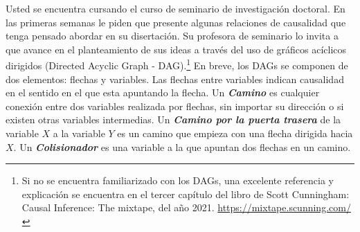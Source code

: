 \documentclass[a4paper]{article}
\begin{document}
Usted se encuentra cursando el curso de seminario de investigación doctoral. En las primeras semanas le piden que presente algunas relaciones de causalidad que tenga pensado abordar en su disertación. Su profesora de seminario lo invita a que avance en el planteamiento de sus ideas a través del uso de gráficos acíclicos dirigidos (Directed Acyclic Graph - DAG).\footnote{Si no se encuentra familiarizado con los DAGs, una excelente referencia y explicación se encuentra en el tercer capítulo del libro  de Scott Cunningham: Causal Inference: The mixtape, del año 2021. \url{https://mixtape.scunning.com/}   }  En breve, los DAGs se componen de dos elementos: flechas y variables. Las flechas entre variables indican causalidad en el sentido en el que esta apuntando la flecha. Un \textbf{\textit{Camino}} es cualquier conexión entre dos variables realizada por flechas, sin importar su dirección o si existen otras variables intermedias. Un \textbf{\textit{Camino por la puerta trasera}} de la variable $X$ a la variable $Y$  es un camino que empieza con una flecha dirigida hacia $X$. Un \textbf{\textit{Colisionador}} es una variable a la que apuntan dos flechas en un camino. 
\end{document}
